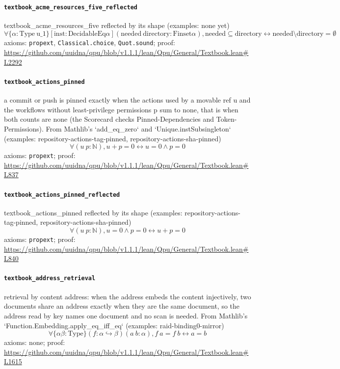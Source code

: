 \documentclass[11pt]{article}
\begin{document}
\paragraph{\texttt{textbook\_acme\_resources\_five\_reflected}}
textbook\_acme\_resources\_five reflected by its shape (examples: none yet)
\[ \forall \{\alpha : \mathrm{Type}\ \mathrm{u\_1}\} [\mathrm{inst} : \mathrm{DecidableEq} \alpha ] (\mathrm{needed}\ \mathrm{directory} : \mathrm{Finset} \alpha ), \mathrm{needed} \subseteq \mathrm{directory} \leftrightarrow \mathrm{needed} \setminus \mathrm{directory} = \emptyset  \]
\noindent axioms: \texttt{propext}, \texttt{Classical.choice}, \texttt{Quot.sound}; proof: \url{https://github.com/uuidna/qpu/blob/v1.1.1/lean/Qpu/General/Textbook.lean\#L2292}

\paragraph{\texttt{textbook\_actions\_pinned}}
a commit or push is pinned exactly when the actions used by a movable ref u and the workflows without least-privilege permissions p sum to none, that is when both counts are none (the Scorecard checks Pinned-Dependencies and Token-Permissions). From Mathlib's `add\_eq\_zero` and `Unique.instSubsingleton` (examples: repository-actions-tag-pinned, repository-actions-sha-pinned)
\[ \forall (u\ p : \mathbb{N}), u + p = 0 \leftrightarrow u = 0 \land p = 0 \]
\noindent axioms: \texttt{propext}; proof: \url{https://github.com/uuidna/qpu/blob/v1.1.1/lean/Qpu/General/Textbook.lean\#L837}

\paragraph{\texttt{textbook\_actions\_pinned\_reflected}}
textbook\_actions\_pinned reflected by its shape (examples: repository-actions-tag-pinned, repository-actions-sha-pinned)
\[ \forall (u\ p : \mathbb{N}), u = 0 \land p = 0 \leftrightarrow u + p = 0 \]
\noindent axioms: \texttt{propext}; proof: \url{https://github.com/uuidna/qpu/blob/v1.1.1/lean/Qpu/General/Textbook.lean\#L840}

\paragraph{\texttt{textbook\_address\_retrieval}}
retrieval by content address: when the address embeds the content injectively, two documents share an address exactly when they are the same document, so the address read by key names one document and no scan is needed. From Mathlib's `Function.Embedding.apply\_eq\_iff\_eq` (examples: raid-binding0-mirror)
\[ \forall \{\alpha \beta : \mathrm{Type}\} (f : \alpha \hookrightarrow \beta ) (a\ b : \alpha ), f\ a = f\ b \leftrightarrow a = b \]
\noindent axioms: none; proof: \url{https://github.com/uuidna/qpu/blob/v1.1.1/lean/Qpu/General/Textbook.lean\#L1615}
\end{document}
